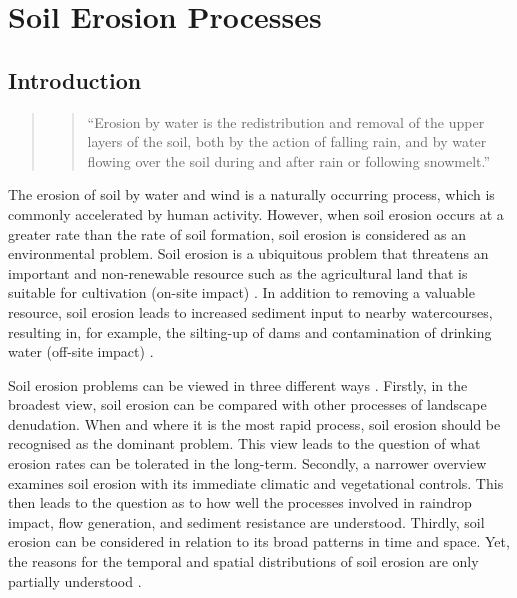 \section{Soil Erosion Processes}
\label{sec:SoilErosionProcesses}

\subsection{Introduction}
\label{sec:ErosionProcessesIntroduction}

\begin{quote}
  \begin{quote}
    ``Erosion by water is the redistribution and removal of the
upper layers of the soil, both by the action of falling rain, and by water
flowing over the soil during and after rain or following snowmelt.''
\citep{favis2002-452}
  \end{quote}
\end{quote}

The erosion of soil by water and wind is a naturally occurring process, which is
commonly accelerated by human activity. However, when soil erosion occurs at a
greater rate than the rate of soil formation, soil erosion is considered as an
environmental problem. Soil erosion is a ubiquitous problem that threatens an
important and non-renewable resource such as the agricultural land that is
suitable for cultivation (on-site impact) \citep{boardman2003-176}. In addition
to removing a valuable resource, soil erosion leads to increased sediment input
to nearby watercourses, resulting in, for example, the silting-up of dams and
contamination of drinking water (off-site impact)
\citep{mejia1994-331,kitchen1998-179}.

Soil erosion problems can be viewed in three different ways
\citep{kirkby1980-312}. Firstly, in the broadest view, soil erosion can be
compared with other processes of landscape denudation. When and where it is the
most rapid process, soil erosion should be recognised as the dominant problem.
This view leads to the question of what erosion rates can be tolerated in the
long-term. Secondly, a narrower overview examines soil erosion with its
immediate climatic and vegetational controls. This then leads to the question as
to how well the processes involved in raindrop impact, flow generation, and
sediment resistance are understood. Thirdly, soil erosion can be considered in
relation to its broad patterns in time and space. Yet, the reasons for the
temporal and spatial distributions of soil erosion are only partially understood
\citep{quine2002-55,gomez2005-143,wakiyama2010-993}.


